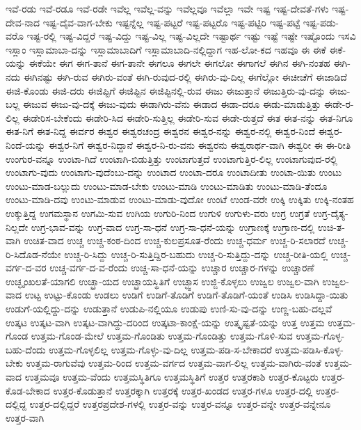 {ಇವೆ-ರಡು
ಇವೆ-ರಡೂ
ಇವೆ-ರಡೇ
ಇವೆಲ್ಲ
ಇವೆಲ್ಲ-ವನ್ನು
ಇವೆಲ್ಲವೂ
ಇವೆಲ್ಲಾ
ಇವೇ
ಇಷ್ಟ
ಇಷ್ಟ-ದೇವತೆ-ಗಳು
ಇಷ್ಟ-ದೇವ-ನಾದ
ಇಷ್ಟ-ದೈವ-ವಾಗ-ಬೇಕು
ಇಷ್ಟನ್ನೆಲ್ಲ
ಇಷ್ಟ-ಪಟ್ಟರೆ
ಇಷ್ಟ-ಪಟ್ಟರೊ
ಇಷ್ಟ-ಪಟ್ಟಿರಿ
ಇಷ್ಟ-ಪಟ್ಟೆ
ಇಷ್ಟ-ಪಡು-ವರೊ
ಇಷ್ಟ-ರಲ್ಲಿ
ಇಷ್ಟ-ವಿದ್ದರೆ
ಇಷ್ಟ-ವಿದ್ದು
ಇಷ್ಟ-ವಿಲ್ಲ
ಇಷ್ಟ-ವಿಲ್ಲದೇ
ಇಷ್ಟಾರ್ಥ
ಇಷ್ಟು
ಇಷ್ಟೆ
ಇಷ್ಟೇ
ಇಷ್ಟೊಂದು
ಇಸವಿ
ಇಸ್ಲಾಂ
ಇಸ್ಲಾಮಾಬಾ-ದನ್ನು
ಇಸ್ಲಾಮಾಬಾದಿಗೆ
ಇಸ್ಲಾಮಾಬಾದಿ-ನಲ್ಲಿದ್ದಾಗ
ಇಹ-ಲೋ-ಕದ
ಇಹವೂ
ಈ
ಈಕೆ
ಈಕೆ-ಯನ್ನು
ಈಕೆಯೇ
ಈಗ
ಈಗ-ತಾನೆ
ಈಗ-ತಾನೇ
ಈಗಲೂ
ಈಗಲೇ
ಈಗಲೋ
ಈಗಾಗಲೆ
ಈಗಿನ
ಈಗಿ-ನಂತಹ
ಈಗಿ-ನದು
ಈಗಿನಷ್ಟು
ಈಗಿ-ರುವ
ಈಗಿರು-ವಂತೆ
ಈಗಿ-ರುವುದ-ರಲ್ಲಿ
ಈಗಿರು-ವು-ದಿಲ್ಲ
ಈಗೆಲ್ಲೋ
ಈಚೀಚೆಗೆ
ಈಜಾಡಿದೆ
ಈಜಿ-ಕೊಂಡು
ಈಜಿ-ದರು
ಈಜಿಪ್ಟಿಗೆ
ಈಜಿಪ್ಟಿನ
ಈಜಿಪ್ಟಿನಲ್ಲಿ-ರುವ
ಈಜು
ಈಜುತ್ತಾನೆ
ಈಜುತ್ತಿರು-ವು-ದನ್ನು
ಈಜು-ಬಲ್ಲ
ಈಜುವ
ಈಜು-ವು-ದಕ್ಕೆ
ಈಜು-ವುದು
ಈಡಾಗಿರು-ವೆನು
ಈಡಾದ
ಈಡಾ-ದರೂ
ಈಡು-ಮಾಡುತ್ತಿತ್ತು
ಈಡೇ-ರ-ಲಿಲ್ಲ
ಈಡೇರಿಸ-ಬೇಕೆಂದು
ಈಡೇರಿ-ಸಿದ
ಈಡೇರಿ-ಸುತ್ತಿಲ್ಲ
ಈಡೇರಿ-ಸುವ
ಈಡೇ-ರುತ್ತದೆ
ಈತ
ಈತ-ನನ್ನು
ಈತ-ನಿಗೂ
ಈತ-ನಿಗೆ
ಈತ-ನಿದ್ದ
ಈರ್ವರ
ಈಶ್ವರ
ಈಶ್ವರಚಂದ್ರ
ಈಶ್ವರನ
ಈಶ್ವರ-ನನ್ನು
ಈಶ್ವರ-ನಲ್ಲಿ
ಈಶ್ವರ-ನಿಂದೆ
ಈಶ್ವರ-ನಿಂದೆ-ಯನ್ನು
ಈಶ್ವರ-ನಿಗೆ
ಈಶ್ವರ-ನಿದ್ದಾನೆ
ಈಶ್ವರ-ನಿ-ರು-ವನು
ಈಶ್ವರನು
ಈಶ್ವರಾರ್ಥ-ವಾಗಿ
ಈಶ್ವರೀ
ಈ
ಈ-ರೀತಿ
ಉಂಗುರ-ವನ್ನೂ
ಉಂಟಾ-ಗಿದೆ
ಉಂಟಾಗಿ-ಬಿಡುತ್ತಿತ್ತು
ಉಂಟಾಗುತ್ತದೆ
ಉಂಟಾಗುತ್ತಿರ-ಲಿಲ್ಲ
ಉಂಟಾಗುವುದ-ರಲ್ಲಿ
ಉಂಟಾಗು-ವುದು
ಉಂಟಾಗು-ವುದೆಂಬು-ದನ್ನು
ಉಂಟಾದ
ಉಂಟಾ-ದರೂ
ಉಂಟಾದೀತು
ಉಂಟಾ-ಯಿತು
ಉಂಟು
ಉಂಟು-ಮಾಡ-ಬಲ್ಲುದು
ಉಂಟು-ಮಾಡ-ಬೇಕು
ಉಂಟು-ಮಾಡಿ
ಉಂಟು-ಮಾಡಿತು
ಉಂಟು-ಮಾಡಿ-ತೆಂದೂ
ಉಂಟು-ಮಾಡಿ-ದವು
ಉಂಟು-ಮಾಡುವ
ಉಂಟು-ಮಾಡು-ವುದೋ
ಉಂಟೆ
ಉಂಡ-ವರೇ
ಉಕ್ಕಿ
ಉಕ್ಕಿತು
ಉಕ್ಕಿ-ನಂತಹ
ಉಕ್ಕುತ್ತಿದ್ದ
ಉಗಮಸ್ಥಾನ
ಉಗಮಿ-ಸುವ
ಉಗಿಯ
ಉಗುರಿ-ನಿಂದ
ಉಗುಳಿ
ಉಗುಳು-ವರು
ಉಗ್ರ
ಉಗ್ರತೆ
ಉಗ್ರ-ದೈತ್ಯ-ನಿಲ್ಲದೇ
ಉಗ್ರ-ಭಾವ-ವನ್ನು
ಉಗ್ರ-ವಾದ
ಉಗ್ರ-ಸಾ-ಧನೆ
ಉಗ್ರ-ಸಾ-ಧನೆ-ಯನ್ನು
ಉಗ್ರಾಣಕ್ಕೆ
ಉಗ್ರಾಣ-ದಲ್ಲಿ
ಉಚಿ-ತ-ವಾಗಿ
ಉಚಿತ-ವಾದ
ಉಚ್ಚ
ಉಚ್ಚ-ಕಂಠ-ದಿಂದ
ಉಚ್ಚ-ಕುಲಪ್ರಸೂತ-ರೆಂದು
ಉಚ್ಚ-ಧರ್ಮ
ಉಚ್ಚ-ರಿ-ಸಲಾರದೆ
ಉಚ್ಚ-ರಿ-ಸಿದೊಡ-ನೆಯೇ
ಉಚ್ಚ-ರಿ-ಸಿದ್ದು
ಉಚ್ಚ-ರಿ-ಸುತ್ತಿದ್ದಿರ-ಬಹುದು
ಉಚ್ಚ-ರಿ-ಸುತ್ತಿದ್ದು-ದನ್ನು
ಉಚ್ಚ-ರೀತಿ-ಯಲ್ಲಿ
ಉಚ್ಚ-ವರ್ಗ-ದ-ವರ
ಉಚ್ಚ-ವರ್ಗ-ದ-ವ-ರೆಂದು
ಉಚ್ಚ-ಸಾ-ಧನೆ-ಯನ್ನು
ಉಚ್ಚಾರ
ಉಚ್ಚಾರ-ಗಳನ್ನು
ಉಚ್ಚಾರಣೆ
ಉಚ್ಛೃಂಖಲತೆ-ಯಾಗಲಿ
ಉಚ್ಛ್ರಾ-ಯದ
ಉಚ್ಛ್ರಾಯಸ್ಥಿತಿಗೆ
ಉಚ್ಛ್ವಾಸ
ಉಜ್ಜಿ-ಕೊಳ್ಳಲು
ಉಜ್ವಲ
ಉಜ್ವಲ-ವಾಗಿ
ಉಜ್ವಲ-ವಾದ
ಉಟ್ಟ
ಉಟ್ಟು-ಕೊಂಡು
ಉಡಲು
ಉಡಿಗೆ
ಉಡಿಗೆ-ತೊಡಿಗೆ
ಉಡಿಗೆ-ತೊಡಿಗೆ-ಯಂತೆ
ಉಡಿಸಿ
ಉಡಿಸಿದ್ದಾ-ಯಿತು
ಉಡುಗೆ-ಯಲ್ಲಿದ್ದು-ದನ್ನು
ಉಡುತ್ತಾನೆ
ಉಡುಪಿ-ನಲ್ಲಿಯೂ
ಉಡುಪು
ಉಣಿ-ಸು-ವು-ದನ್ನು
ಉಣ್ಣ-ಬಹು-ದಲ್ಲವೆ
ಉತ್ಕಟ
ಉತ್ಕಟ-ವಾಗಿ
ಉತ್ಕಟ-ವಾಗಿದ್ದು-ದರಿಂದ
ಉತ್ಕಟಾ-ಕಾಂಕ್ಷೆ-ಯನ್ನು
ಉತ್ಕೃಷ್ಟತೆ-ಯನ್ನು
ಉತ್ತ
ಉತ್ತಮ
ಉತ್ತಮ-ಗೊಂಡ
ಉತ್ತಮ-ಗೊಂಡ-ಮೇಲೆ
ಉತ್ತಮ-ಗೊಂಡಿತು
ಉತ್ತಮ-ಗೊಂಡಿತ್ತು
ಉತ್ತಮ-ಗೊಳಿ-ಸುವ
ಉತ್ತಮ-ಗೊಳ್ಳ-ಬಹು-ದೆಂದು
ಉತ್ತಮ-ಗೊಳ್ಳಲಿಲ್ಲ
ಉತ್ತಮ-ಗೊಳ್ಳು-ವು-ದಿಲ್ಲ
ಉತ್ತಮ-ಪಡಿ-ಸ-ಬೇಕಾದರೆ
ಉತ್ತಮ-ಪಡಿಸಿ-ಕೊಳ್ಳ-ಬೇಕು
ಉತ್ತಮ-ರಾಗುವೆವು
ಉತ್ತಮ-ರಿಂದ
ಉತ್ತಮ-ವರ್ಗದ
ಉತ್ತಮ-ವಾಗ-ಲಿಲ್ಲ
ಉತ್ತಮ-ವಾಗಿರು-ವಂತೆ
ಉತ್ತಮ-ವಾದ
ಉತ್ತಮವೂ
ಉತ್ತಮ-ವೆಂದು
ಉತ್ತಮಸ್ಥಿತಿಗೂ
ಉತ್ತಮಸ್ಥಿತಿಗೆ
ಉತ್ತರ
ಉತ್ತರಕಾಶಿ
ಉತ್ತರ-ಕೊಟ್ಟರು
ಉತ್ತರ-ಕೊಡ-ಬೇಕಾದ
ಉತ್ತರ-ಕೊಡುತ್ತಾನೆ
ಉತ್ತರಕ್ಕಾಗಿ
ಉತ್ತರಕ್ಕೆ
ಉತ್ತರ-ಖಂಡದ
ಉತ್ತರ-ಗಳೂ
ಉತ್ತರ-ದಲ್ಲಿ
ಉತ್ತರ-ದಲ್ಲಿದ್ದ
ಉತ್ತರ-ದಲ್ಲಿದ್ದರೆ
ಉತ್ತರಪ್ರದೇಶ-ಗಳಲ್ಲಿ
ಉತ್ತರ-ವನ್ನು
ಉತ್ತರ-ವನ್ನೂ
ಉತ್ತರ-ವನ್ನೇ
ಉತ್ತರ-ವನ್ನೇನೂ
ಉತ್ತರ-ವಾಗಿ
}

